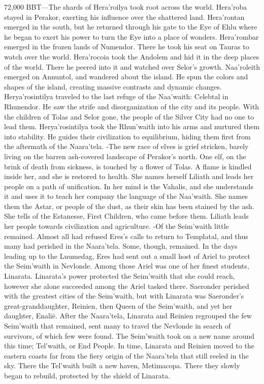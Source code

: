 \documentclass[smalldemyvopaper,11pt,twoside,onecolumn,openright,extrafontsizes]{memoir}
\begin{document}
72,000 BBT—The shards of Hera’roilya took root across the world. Hera’roba stayed in Perakor, exerting his influence over the shattered land. Hera’rontan emerged in the south, but he returned through his gate to the Eye of Ehlu where he began to exert his power to turn the Eye into a place of wonders. Hera’rombar emerged in the frozen lands of Numendor. There he took his seat on Tauras to watch over the world. Hera’rocoia took the Andolem and hid it in the deep places of the world. There he peered into it and watched over Selor’s growth. Naa’roleith emerged on Annuntol, and wandered about the island. He spun the colors and shapes of the island, creating massive contrasts and dynamic changes. Herya’rosintilya traveled to the last refuge of the Naa’waith: Celebtal in Rhunendor. He saw the strife and disorganization of the city and its people. With the children of Tolas and Selor gone, the people of the Silver City had no one to lead them. Herya’rosintilya took the Rhun’waith into his arms and nurtured them into stability. He guides their civilization to equilibrium, hiding them first from the aftermath of the Naara’tela.
-The new race of elves is grief stricken, barely living on the barren ash-covered landscape of Perakor’s north. One elf, on the brink of death from sickness, is touched by a flower of Tolas. A flame is kindled inside her, and she is restored to health. She names herself Liliath and leads her people on a path of unification. In her mind is the Vahalis, and she understands it and uses it to teach her company the language of the Naa’waith. She names them the Astar, or people of the dust, as their skin has been stained by the ash. She tells of the Estanesse, First Children, who came before them. Liliath leads her people towards civilization and agriculture.
-Of the Seim’waith little remained. Almost all had refused Eres’s calls to return to Templatal, and thus many had perished in the Naara’tela. Some, though, remained. In the days leading up to the Luumedag, Eres had sent out a small host of Ariel to protect the Seim’waith in Nevlonde. Among those Ariel was one of her finest students, Linarata. Linarata’s power protected the Seim’waith that she could reach, however she alone succeeded among the Ariel tasked there. Saeronder perished with the greatest cities of the Seim’waith, but with Linarata was Saeronder’s great-granddaughter, Reinien, then Queen of the Seim’waith, and yet her daughter, Enalië. After the Naara’tela, Linarata and Reinien regrouped the few Seim’waith that remained, sent many to travel the Nevlonde in search of survivors, of which few were found. The Seim’waith took on a new name around this time; Tel’waith, or End People. In time, Linarata and Reinien moved to the eastern coasts far from the fiery origin of the Naara’tela that still reeled in the sky. There the Tel’waith built a new haven, Metimacopa. There they slowly began to rebuild, protected by the shield of Linarata.
\end{document}
